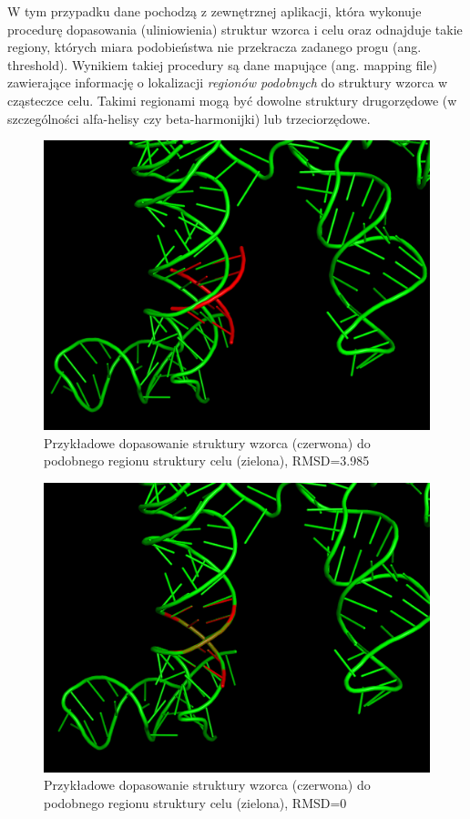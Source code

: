 \documentclass[licencjacka]{pracamgr}
\begin{document}
W tym przypadku dane pochodzą z zewnętrznej aplikacji, która wykonuje procedurę dopasowania (uliniowienia) struktur wzorca i celu oraz odnajduje takie regiony, których miara podobieństwa nie przekracza zadanego progu (ang. threshold). Wynikiem takiej procedury są dane mapujące (ang. mapping file) zawierające informację o lokalizacji \textit{regionów podobnych} do struktury wzorca w cząsteczce celu. Takimi regionami mogą być dowolne struktury drugorzędowe (w szczególności alfa-helisy czy beta-harmonijki) lub trzeciorzędowe.

\begin{figure}[H]
\centering
\includegraphics[scale=0.2]{rmsd3}
\caption{Przykładowe dopasowanie struktury wzorca (czerwona) do podobnego regionu struktury celu (zielona), RMSD=3.985}
\end{figure}


\begin{figure}[H]
\centering
\includegraphics[scale=0.2]{rmsd0}
\caption{Przykładowe dopasowanie struktury wzorca (czerwona) do podobnego regionu struktury celu (zielona), RMSD=0}
\end{figure}
\end{document}
